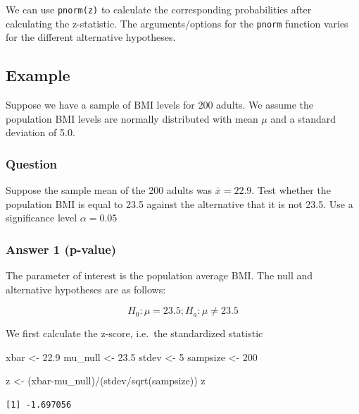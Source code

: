\documentclass[
  letterpaper,
  DIV=11,
  numbers=noendperiod]{scrartcl}
\newenvironment{Shaded}{\begin{snugshade}}{\end{snugshade}}
\newcommand{\DecValTok}[1]{\textcolor[rgb]{0.68,0.00,0.00}{#1}}
\newcommand{\FloatTok}[1]{\textcolor[rgb]{0.68,0.00,0.00}{#1}}
\newcommand{\FunctionTok}[1]{\textcolor[rgb]{0.28,0.35,0.67}{#1}}
\newcommand{\NormalTok}[1]{\textcolor[rgb]{0.00,0.23,0.31}{#1}}
\newcommand{\OtherTok}[1]{\textcolor[rgb]{0.00,0.23,0.31}{#1}}
\newcommand{\SpecialCharTok}[1]{\textcolor[rgb]{0.37,0.37,0.37}{#1}}
\begin{document}
We can use \texttt{pnorm(z)} to calculate the corresponding
probabilities after calculating the z-statistic. The arguments/options
for the \texttt{pnorm} function varies for the different alternative
hypotheses.

\subsection{Example}\label{example-3}

Suppose we have a sample of BMI levels for 200 adults. We assume the
population BMI levels are normally distributed with mean \(\mu\) and a
standard deviation of 5.0.

\subsubsection{Question}

Suppose the sample mean of the 200 adults was \(\bar{x}=22.9\). Test
whether the population BMI is equal to 23.5 against the alternative that
it is not 23.5. Use a significance level \(\alpha=0.05\)

\subsubsection{Answer 1 (p-value)}

The parameter of interest is the population average BMI. The null and
alternative hypotheses are as follows:

\[
H_0: \mu = 23.5; H_a: \mu \neq 23.5
\]

We first calculate the z-score, i.e.~the standardized statistic

\begin{Shaded}
\begin{Highlighting}[]
\NormalTok{xbar }\OtherTok{\textless{}{-}} \FloatTok{22.9}
\NormalTok{mu\_null }\OtherTok{\textless{}{-}} \FloatTok{23.5}
\NormalTok{stdev }\OtherTok{\textless{}{-}} \DecValTok{5}
\NormalTok{sampsize }\OtherTok{\textless{}{-}} \DecValTok{200}

\NormalTok{z }\OtherTok{\textless{}{-}}\NormalTok{ (xbar}\SpecialCharTok{{-}}\NormalTok{mu\_null)}\SpecialCharTok{/}\NormalTok{(stdev}\SpecialCharTok{/}\FunctionTok{sqrt}\NormalTok{(sampsize))}
\NormalTok{z}
\end{Highlighting}
\end{Shaded}

\begin{verbatim}
[1] -1.697056
\end{verbatim}
\end{document}
